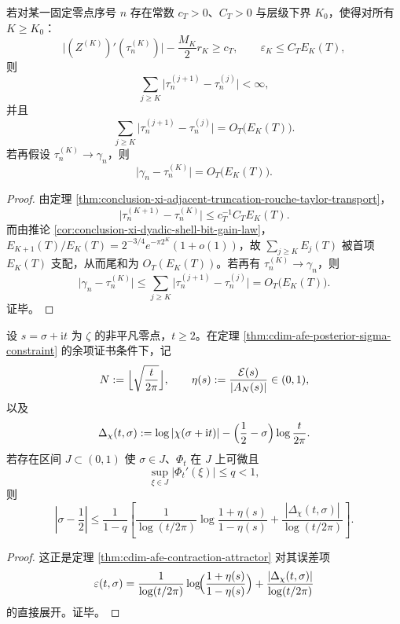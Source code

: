 \begin{corollary}\label{cor:conclusion-xi-zero-tower-superexp-cauchy-tail}
若对某一固定零点序号 \(n\) 存在常数 \(c_T>0\)、\(C_T>0\) 与层级下界 \(K_0\)，使得对所有 \(K\ge K_0\)：
\[
\bigl|(Z^{(K)})'(\tau_n^{(K)})\bigr|-\frac{M_K}{2}r_K\ge c_T,
\qquad
\varepsilon_K\le C_T E_K(T),
\]
则
\[
\sum_{j\ge K}\bigl|\tau_n^{(j+1)}-\tau_n^{(j)}\bigr|<\infty,
\]
并且
\[
\sum_{j\ge K}\bigl|\tau_n^{(j+1)}-\tau_n^{(j)}\bigr|
=
O_T\!\bigl(E_K(T)\bigr).
\]
若再假设 \(\tau_n^{(K)}\to \gamma_n\)，则
\[
\bigl|\gamma_n-\tau_n^{(K)}\bigr|
=
O_T\!\bigl(E_K(T)\bigr).
\]
\end{corollary}
\begin{proof}
由定理 \ref{thm:conclusion-xi-adjacent-truncation-rouche-taylor-transport}，
\[
\bigl|\tau_n^{(K+1)}-\tau_n^{(K)}\bigr|
\le c_T^{-1}C_T E_K(T).
\]
而由推论 \ref{cor:conclusion-xi-dyadic-shell-bit-gain-law}，\(E_{K+1}(T)/E_K(T)=2^{-3/4}e^{-\pi 2^K}(1+o(1))\)，故 \(\sum_{j\ge K}E_j(T)\) 被首项 \(E_K(T)\) 支配，从而尾和为 \(O_T(E_K(T))\)。若再有 \(\tau_n^{(K)}\to\gamma_n\)，则
\[
\bigl|\gamma_n-\tau_n^{(K)}\bigr|
\le
\sum_{j\ge K}\bigl|\tau_n^{(j+1)}-\tau_n^{(j)}\bigr|
=
O_T\!\bigl(E_K(T)\bigr).
\]
证毕。
\end{proof}

\begin{theorem}[后验实部偏移的双标量压缩律]\label{thm:conclusion-xi-posterior-realpart-two-scalar-compression}
设 \(s=\sigma+\mathrm{i}t\) 为 \(\zeta\) 的非平凡零点，\(t\ge 2\)。在定理 \ref{thm:cdim-afe-posterior-sigma-constraint} 的余项证书条件下，记
\[
N:=\Bigl\lfloor \sqrt{\frac{t}{2\pi}}\Bigr\rfloor,
\qquad
\eta(s):=\frac{\mathcal E(s)}{|A_N(s)|}\in(0,1),
\]
以及
\[
\Delta_\chi(t,\sigma):=
\log|\chi(\sigma+\mathrm{i}t)|
-\Bigl(\frac12-\sigma\Bigr)\log\frac{t}{2\pi}.
\]
若存在区间 \(J\subset(0,1)\) 使 \(\sigma\in J\)、\(\Phi_t\) 在 \(J\) 上可微且
\[
\sup_{\xi\in J}|\Phi_t'(\xi)|\le q<1,
\]
则
\[
\left|\sigma-\frac12\right|
\le
\frac{1}{1-q}
\left[
\frac{1}{\log(t/2\pi)}
\log\frac{1+\eta(s)}{1-\eta(s)}
+
\frac{|\Delta_\chi(t,\sigma)|}{\log(t/2\pi)}
\right].
\]
\end{theorem}
\begin{proof}
这正是定理 \ref{thm:cdim-afe-contraction-attractor} 对其误差项
\[
\varepsilon(t,\sigma)=
\frac{1}{\log(t/2\pi)}
\log\!\Bigl(\frac{1+\eta(s)}{1-\eta(s)}\Bigr)
+
\frac{|\Delta_\chi(t,\sigma)|}{\log(t/2\pi)}
\]
的直接展开。证毕。
\end{proof}

